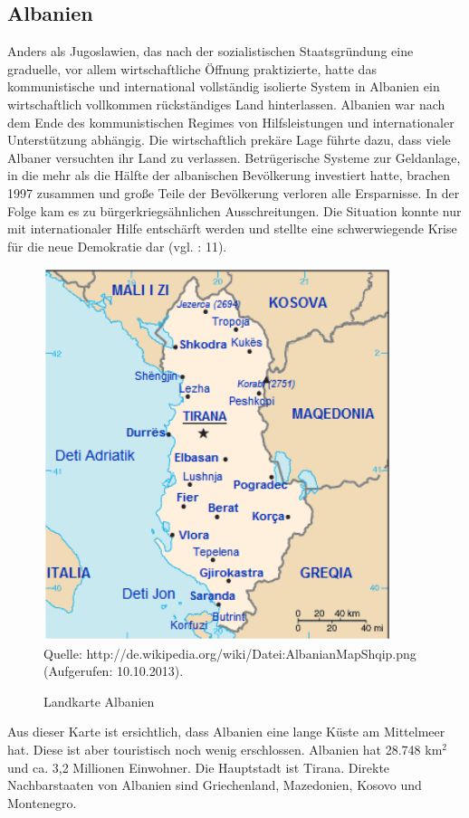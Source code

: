 \subsection{Albanien}
Anders als Jugoslawien, das nach der sozialistischen Staatsgründung eine graduelle, vor allem wirtschaftliche Öffnung praktizierte, hatte das kommunistische und international vollständig isolierte System in Albanien ein wirtschaftlich vollkommen rückständiges Land hinterlassen. Albanien war nach dem Ende des kommunistischen Regimes von Hilfsleistungen und internationaler Unterstützung abhängig. Die wirtschaftlich prekäre Lage führte dazu, dass viele Albaner versuchten ihr Land zu verlassen. Betrügerische Systeme zur Geldanlage, in die mehr als die Hälfte der albanischen Bevölkerung investiert hatte, brachen 1997 zusammen und große Teile der Bevölkerung verloren alle Ersparnisse. In der Folge kam es zu bürgerkriegsähnlichen Ausschreitungen. Die Situation konnte nur mit internationaler Hilfe entschärft werden und stellte eine schwerwiegende Krise für die neue Demokratie dar (vgl. \cite{jarvis} : 11).
\begin{figure}[H]

  \caption{Landkarte Albanien}
  \centering
  \includegraphics[width=4in]{Material/AlbanianMapShqip}\\
  Quelle: http://de.wikipedia.org/wiki/Datei:AlbanianMapShqip.png (Aufgerufen: 10.10.2013).
\end{figure}
Aus dieser Karte ist ersichtlich, dass Albanien eine lange Küste am Mittelmeer hat. Diese ist aber touristisch noch wenig erschlossen. Albanien hat 28.748 km$^2$ und ca. 3,2 Millionen Einwohner. Die Hauptstadt ist Tirana. Direkte Nachbarstaaten von Albanien sind Griechenland, Mazedonien, Kosovo und Montenegro.

